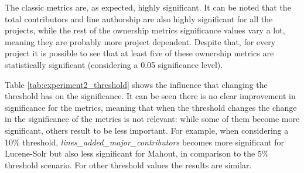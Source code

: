 The classic metrics are, as expected, highly significant. It can be noted that the total contributors and line authorship are also highly significant for all the projects, while the rest of the ownership metrics significance values vary a lot, meaning they are probably more project dependent. Despite that, for every project it is possible to see that at least five of these ownership metrics are statistically significant (considering a 0.05 significance level).

Table \ref{tab:experiment2_threshold} shows the influence that changing the threshold has on the significance. It can be seen there is no clear improvement in significance for the metrics, meaning that when the threshold changes the change in the significance of the metrics is not relevant: while some of them become more significant, others result to be less important. For example, when considering a 10\% threshold, \textit{lines\_added\_major\_contributors} becomes more significant for Lucene-Solr but also less significant for Mahout, in comparison to the 5\% threshold scenario. For other threshold values the results are similar.


